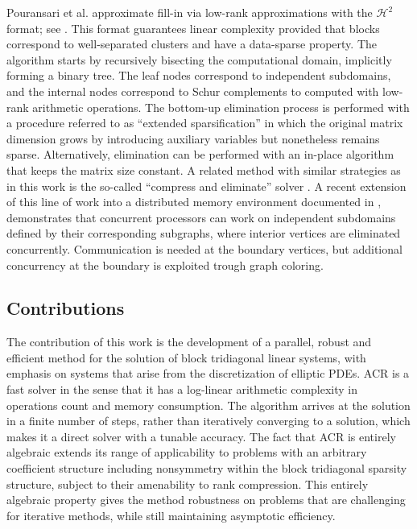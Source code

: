 \documentclass[]{elsarticle}
\begin{document}
Pouransari et al. approximate fill-in via low-rank approximations with the $\mathcal{H}^2$ format; see \cite{Pouransari2016}. This format guarantees linear complexity provided that blocks correspond to well-separated clusters and have a data-sparse property. The algorithm starts by recursively bisecting the computational domain, implicitly forming a binary tree. The leaf nodes correspond to independent subdomains, and the internal nodes correspond to Schur complements to computed with low-rank arithmetic operations. The bottom-up elimination process is performed with a procedure referred to as ``extended sparsification'' in which the original matrix dimension grows by introducing auxiliary variables but nonetheless remains sparse. Alternatively, elimination can be performed with an in-place algorithm that keeps the matrix size constant. A related method with similar strategies as in this work is the so-called ``compress and eliminate'' solver \cite{Sushnikova2016}. A recent extension of this line of work into a distributed memory environment documented in \cite{Chen17}, demonstrates that concurrent processors can work on independent subdomains defined by their corresponding subgraphs, where interior vertices are eliminated concurrently. Communication is needed at the boundary vertices, but additional concurrency at the boundary is exploited trough graph coloring.

\subsection{Contributions}

The contribution of this work is the development of a parallel, robust and efficient method for the solution of block tridiagonal linear systems, with emphasis on systems that arise from the discretization of elliptic PDEs. ACR is a fast solver in the sense that it has a log-linear arithmetic complexity in operations count and memory consumption. The algorithm arrives at the solution in a finite number of steps, rather than iteratively converging to a solution, which makes it a direct solver with a tunable accuracy. The fact that ACR is entirely algebraic extends its range of applicability to problems with an arbitrary coefficient structure including nonsymmetry within the block tridiagonal sparsity structure, subject to their amenability to rank compression.  This entirely algebraic property gives the method robustness on problems that are challenging for iterative methods, while still maintaining asymptotic efficiency.
\end{document}
